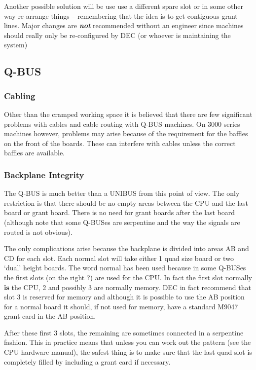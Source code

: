 Another possible solution will be use use a different spare slot
or in some other way re-arrange things -- remembering that the idea is to
get contiguous grant lines.
Major changes are {\bf \it not} recommended without an engineer since
machines should really only be re-configured by DEC (or whoever is maintaining
the system)


\subsection{Q-BUS}

\subsubsection{Cabling}

Other than the cramped working space it is believed that there are few
 significant problems with cables and cable routing with Q-BUS machines.
On 3000 series machines however, problems may arise because of the
requirement for the baffles on the front of the boards.
These can interfere with cables unless the correct baffles are available.

\subsubsection{Backplane Integrity}

The Q-BUS is much better than a UNIBUS from this point of view.
 The only restriction is that there should be no empty areas between the
 CPU and the last board or grant board.
There is no need for grant boards after the last board (although note that
some Q-BUSes are serpentine and the way the signals are routed is not
obvious).

The only complications arise because the backplane is divided into areas
AB and CD for each slot.
Each normal slot will take either 1 quad size board or two `dual' height
boards.
The word normal has been used because in some Q-BUSes the first slots
(on the right ?) are used for the CPU.
In fact the first slot normally {\bf is} the CPU, 2 and possibly 3 are
normally memory.
 DEC in fact recommend that slot 3 is reserved for memory and although
 it is possible to use the AB position for a normal board it should, if
 not used for memory, have a standard M9047 grant card in the AB position.

 After these first 3 slots, the remaining are sometimes connected
 in a serpentine fashion.
 This in practice means that unless you can work
 out the pattern (see the CPU hardware manual), the safest thing is to
make sure that the last quad slot is
 completely filled by including a grant card if necessary.

